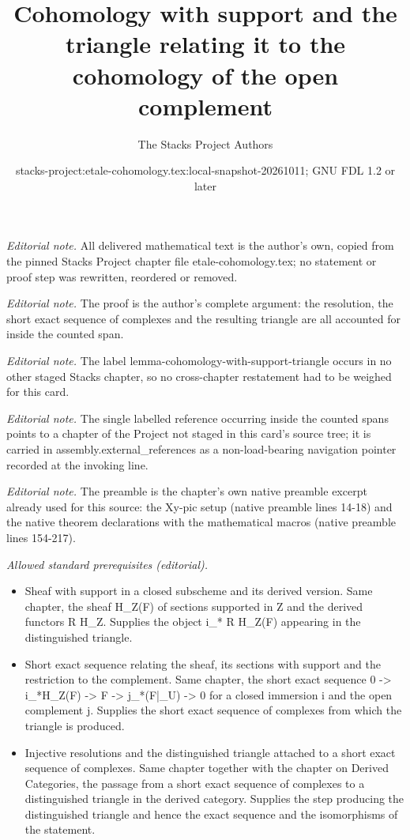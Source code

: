 \documentclass[10pt,a4paper]{amsart}
\title{Cohomology with support and the triangle relating it to the cohomology of the open complement}
\author{The Stacks Project Authors}
\date{stacks-project:etale-cohomology.tex:local-snapshot-20261011; GNU FDL 1.2 or later}
\theoremstyle{plain}
\theoremstyle{definition}
\theoremstyle{remark}
\numberwithin{equation}{subsection}
\begin{document}
\maketitle
\noindent\textit{Editorial note.} All delivered mathematical text is the author's own, copied from the pinned Stacks Project chapter file etale-cohomology.tex; no statement or proof step was rewritten, reordered or removed.\par\medskip
\noindent\textit{Editorial note.} The proof is the author's complete argument: the resolution, the short exact sequence of complexes and the resulting triangle are all accounted for inside the counted span.\par\medskip
\noindent\textit{Editorial note.} The label lemma-cohomology-with-support-triangle occurs in no other staged Stacks chapter, so no cross-chapter restatement had to be weighed for this card.\par\medskip
\noindent\textit{Editorial note.} The single labelled reference occurring inside the counted spans points to a chapter of the Project not staged in this card's source tree; it is carried in assembly.external\_references as a non-load-bearing navigation pointer recorded at the invoking line.\par\medskip
\noindent\textit{Editorial note.} The preamble is the chapter's own native preamble excerpt already used for this source: the Xy-pic setup (native preamble lines 14-18) and the native theorem declarations with the mathematical macros (native preamble lines 154-217).\par\medskip
\noindent\textit{Allowed standard prerequisites (editorial).}\begin{itemize}
\item Sheaf with support in a closed subscheme and its derived version. Same chapter, the sheaf H\_Z(F) of sections supported in Z and the derived functors R H\_Z. Supplies the object i\_* R H\_Z(F) appearing in the distinguished triangle.
\item Short exact sequence relating the sheaf, its sections with support and the restriction to the complement. Same chapter, the short exact sequence 0 -> i\_*H\_Z(F) -> F -> j\_*(F|\_U) -> 0 for a closed immersion i and the open complement j. Supplies the short exact sequence of complexes from which the triangle is produced.
\item Injective resolutions and the distinguished triangle attached to a short exact sequence of complexes. Same chapter together with the chapter on Derived Categories, the passage from a short exact sequence of complexes to a distinguished triangle in the derived category. Supplies the step producing the distinguished triangle and hence the exact sequence and the isomorphisms of the statement.
\end{itemize}\medskip
\end{document}
